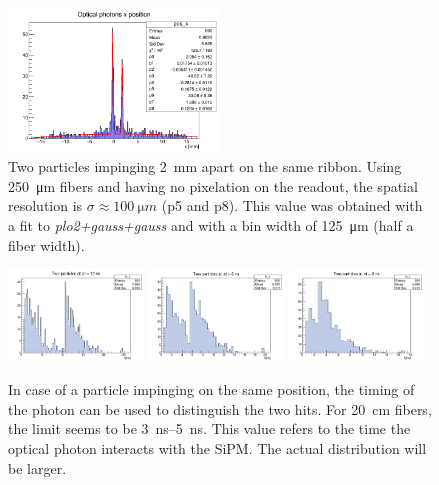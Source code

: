 \begin{refsection}
        \begin{figure}
            \centering
            \includegraphics[width=0.5\textwidth]{Figures/muEDM/Tracker/2mm.png}
            \caption[SciFi \gf: spatial resolution]{Two particles impinging \SI{2}{mm} apart on the same ribbon. Using \SI{250}{\micro m} fibers and having no pixelation on the readout, the spatial resolution is $\sigma\approx \SI{100}{\micro m}$ (p5 and p8). This value was obtained with a fit to \textit{plo2+gauss+gauss} and with a bin width of \SI{125}{\micro m} (half a fiber width).}
            \label{fig:geant4_position_resolution}
        \end{figure}
    
        

        \begin{figure}
            \centering
            \includegraphics[width=0.32\textwidth]{Figures/muEDM/Tracker/10ns.png}
            \includegraphics[width=0.32\textwidth]{Figures/muEDM/Tracker/5ns.png}
            \includegraphics[width=0.32\textwidth]{Figures/muEDM/Tracker/2ns.png}
            \caption[SciFi \gf: time resolution]{In case of a particle impinging on the same position, the timing of the photon can be used to distinguish the two hits. For \SI{20}{cm} fibers, the limit seems to be \SIrange{3}{5}{ns}. This value refers to the time the optical photon interacts with the SiPM. The actual distribution will be larger.}
            \label{fig:geant4_time}
        \end{figure}


\end{refsection}
